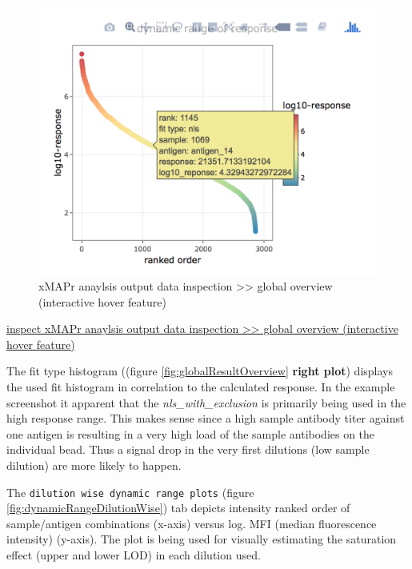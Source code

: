 \documentclass[]{book}
\theoremstyle{definition}
\theoremstyle{definition}
\theoremstyle{definition}
\theoremstyle{remark}
\begin{document}
\begin{figure}

{\centering \includegraphics[width=14.56in]{figures/global_result_overview1} 

}

\caption{xMAPr anaylsis output data inspection >> global overview (interactive hover feature)}\label{fig:globalResultOverview1}
\end{figure}

\href{figures/global_result_overview1.png}{inspect xMAPr anaylsis output
data inspection \textgreater{}\textgreater{} global overview
(interactive hover feature)}

The fit type histogram ((figure \ref{fig:globalResultOverview}
\textbf{right plot}) displays the used fit histogram in correlation to
the calculated response. In the example screenshot it apparent that the
\emph{nls\_with\_exclusion} is primarily being used in the high response
range. This makes sense since a high sample antibody titer against one
antigen is resulting in a very high load of the sample antibodies on the
individual bead. Thus a signal drop in the very first dilutions (low
sample dilution) are more likely to happen.

The \texttt{dilution\ wise\ dynamic\ range\ plots} (figure
\ref{fig:dynamicRangeDilutionWise}) tab depicts intensity ranked order
of sample/antigen combinations (x-axis) versus log. MFI (median
fluorescence intensity) (y-axis). The plot is being used for visually
estimating the saturation effect (upper and lower LOD) in each dilution
used.
\end{document}
